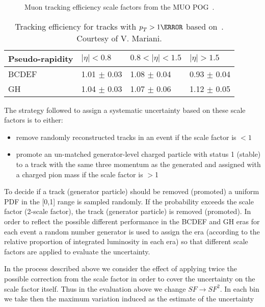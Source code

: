 \begin{description}
\begin{figure}[htp]
\centering
{}
\caption{Muon tracking efficiency scale factors from the MUO POG~\cite{twiki:MUO}.}
\label{fig:mutksf}
\end{figure}

\begin{table}[htb]
\begin{center}
\caption{Tracking efficiency for tracks with $\pt>1\GeV$ based on~\cite{CMS-AN-2015-048,twiki:trkpogeff,CMS-DP-2016-012}.
Courtesy of V. Mariani.}
\label{tab:dstartsf}
\begin{tabular}{llll}
\hline
Pseudo-rapidity & $|\eta|<0.8$ & $0.8<|\eta|<1.5$ & $|\eta|>1.5$ \\
\hline
BCDEF & 1.01 $\pm$ 0.03 & 1.08 $\pm$ 0.04 & 0.93 $\pm$ 0.04 \\
GH & 1.04 $\pm$ 0.03 & 1.07 $\pm$ 0.06 & 1.12 $\pm$ 0.05 \\
\hline
\end{tabular}
\end{center}
\end{table}
The strategy followed to assign a systematic uncertainty based on these scale factors is to either:

\begin{itemize}
\item remove randomly reconstructed tracks in an event if the scale factor is $<1$
\item promote an un-matched generator-level charged particle with status 1 (stable) to a track with the same
three momentum as the generated and assigned with a charged pion mass if the scale factor is $>$1
\end{itemize}

To decide if a track (generator particle) should be removed (promoted) a uniform PDF in the [0,1] range is sampled randomly. If the probability exceeds the scale factor (2-scale factor), the track (generator particle) is removed (promoted). In order to reflect the possible different performance in the BCDEF and GH eras for each event a random number generator is used to assign the era (according to the relative proportion of integrated luminosity in each era) so that different scale factors are applied to evaluate the uncertainty.

In the process described above we consider the effect of applying twice the possible correction from the scale factor in order to cover the uncertainty on the scale factor itself. Thus in the evaluation above we change $SF\rightarrow SF^2$. In each bin we take then the maximum variation induced as the estimate of the uncertainty 


\end{description}
